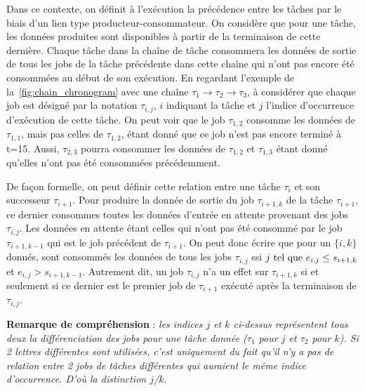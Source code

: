 \documentclass[french, a4paper, 11pt, twoside, pdftex]{StyleThese}
\begin{document}
	    Dans ce contexte, on définit à l'exécution la précédence entre les tâches par le biais d'un lien type producteur-consommateur. On considère que pour une tâche, les données produites sont disponibles à partir de la terminaison de cette dernière. Chaque tâche dans la chaîne de tâche consommera les données de sortie de tous les jobs de la tâche précédente dans cette chaîne qui n'ont pas encore été consommées au début de son exécution. En regardant l'exemple de la~\autoref{fig:chain_chronogram} avec une chaîne $\tau_1 \rightarrow \tau_2 \rightarrow \tau_3$, à considérer que chaque job est désigné par la notation $ \tau_{i,j} $, $i$ indiquant la tâche et $j$ l'indice d'occurrence d'exécution de cette tâche. On peut voir que le job $ \tau_{1,2} $ consomme les données de $ \tau_{1,1} $, mais pas celles de $ \tau_{1,2} $, étant donné que ce job n'est pas encore terminé à t=15. Aussi, $ \tau_{2,3} $ pourra consommer les données de $ \tau_{1,2} $ et $ \tau_{1,3} $ étant donné qu'elles n'ont pas été consommées précédemment. 
	    
	    De façon formelle, on peut définir cette relation entre une tâche $\tau_i$ et son successeur $\tau_{i+1}$. Pour produire la donnée de sortie du job $\tau_{i+1,k}$ de la tâche $\tau_{i+1}$, ce dernier consommes toutes les données d'entrée en attente provenant des jobs $\tau_{i,j}$. Les données en attente étant celles qui n'ont pas été consommé par le job $\tau_{i+1,k-1}$ qui est le job précédent de $\tau_{i+1}$. On peut donc écrire que pour un $\{i,k\}$ donnés, sont consommés les données de tous les jobs $\tau_{i,j}$ ssi $j \textup{ tel que } e_{i,j} \leq s_{i+1, k}$ et $e_{i,j} > s_{i+1, k-1}$. Autrement dit, un job $\tau_{i,j}$ n'a un effet sur $\tau_{i+1,k}$ si et seulement si ce dernier est le premier job de $\tau_{i+1}$ exécuté après la terminaison de $\tau_{i,j}$.
	    
	    \textbf{Remarque de compréhension} : \textit{les indices $j$ et $k$ ci-dessus représentent tous deux la différenciation des jobs pour une tâche donnée ($\tau_1$ pour $j$ et $\tau_2$ pour $k$). Si 2 lettres différentes sont utilisées, c'est uniquement du fait qu'il n'y a pas de relation entre 2 jobs de tâches différentes qui auraient le même indice d'occurrence. D'où la distinction $j$/$k$}. 
	    
\end{document}
